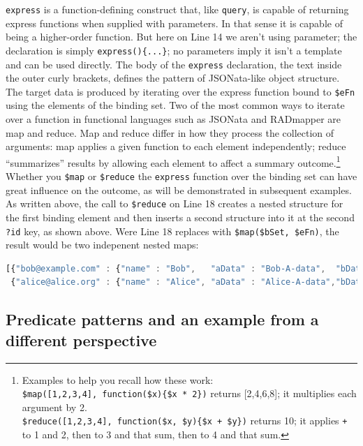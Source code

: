 \documentclass[9pt,letterpaper]{article}
\newcommand{\stt}[1]{\texttt{#1}} %
\begin{document}
\stt{express} is a function-defining construct that, like \stt{query}, is capable of returning express functions when supplied with parameters.
In that sense it is capable of being a higher-order function.
But here on Line 14 we aren't using parameter; the declaration is simply \stt{express()\{...\}}; no parameters imply it isn't a template and can be used directly.
The body of the \stt{express} declaration, the text inside the outer curly brackets, defines the pattern of JSONata-like object structure.
The target data is produced by iterating over the express function bound to \stt{\$eFn} using the elements of the binding set.
Two of the most common ways to iterate over a function in functional languages such as JSONata and RADmapper are map and reduce.
Map and reduce differ in how they process the collection of arguments:
map applies a given function to each element independently;
reduce ``summarizes'' results by allowing each element to affect a summary outcome.\footnote{Examples to help you recall how these work:
  \\ \stt{\$map([1,2,3,4], function(\$x)\{\$x * 2\})} returns [2,4,6,8]; it multiplies each argument by 2.
  \\ \stt{\$reduce([1,2,3,4], function(\$x, \$y)\{\$x + \$y\})} returns 10; it applies \stt{+} to 1 and 2, then to 3 and that sum,
  then to 4 and that sum.}
Whether you \stt{\$map} or \stt{\$reduce} the \stt{express} function over the binding set can have great influence on the outcome, as will be demonstrated in subsequent examples.
As written above, the call to \stt{\$reduce} on Line 18 creates a nested structure for the first binding element and then inserts a second structure into it at the second \stt{?id} key, as shown above.
Were Line 18 replaces with \stt{\$map(\$bSet, \$eFn)}, the result would be two indepenent nested maps:

\begin{lstlisting}[language=JavaScript,basicstyle=\ttfamily\scriptsize,numbers=none]
[{"bob@example.com" : {"name" : "Bob",   "aData" : "Bob-A-data",  "bData" : "Bob-B-data"  }},
 {"alice@alice.org" : {"name" : "Alice", "aData" : "Alice-A-data","bData" : "Alice-B-data"}}].
\end{lstlisting} \vspace{-2em}

\subsection{Predicate patterns and an example from a different perspective}
\end{document}
